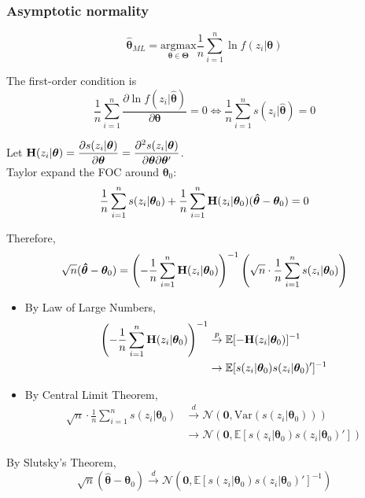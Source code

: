 \documentclass[%
 aip,
 jmp,%
 amsmath,amssymb,
 reprint,%
]{revtex4-1}
\def\N{{\mathbb N}}
\def\th{\theta}
\def\E{\mathbb{E}}
\def\N{\mathcal{N}} %
\def\Var{\mathrm{Var}}
\def\H{\textbf{\textrm{H}}} %
\def\pto{\overset{p}{\to}}
\def\dto{\overset{d}{\to}}
\def\h{\hat}
\def\l{\left}
\def\r{\right}
\newcommand{\mean}[1]{\frac{1}{n}\sum_{i=1}^{n} #1}
\renewcommand{\vec}[1]{\bm{#1}}
\begin{document}
\subsubsection{Asymptotic normality}
$$ \vec{\h\th}_{ML} = \underset{\vec\th \in \vec\Theta}{\mathrm{argmax}} \mean \ln f(z_i|\vec\th) $$

The first-order condition is
$$ \mean \frac{\partial\ln f(z_i|\vec{\h\th})}{\partial\vec\th} = 0 \Leftrightarrow \mean s(z_i|\vec{\h\th}) = 0 $$

Let $\displaystyle \H(z_i|\vec\th) = \frac{\partial s(z_i|\vec{\th})}{\partial\vec\th} = \frac{\partial^2 s(z_i|\vec{\th})}{\partial\vec\th\partial\vec\th'}$.\\

Taylor expand the FOC around $\vec\th_0$:
$$ \mean s(z_i|\vec\th_0) + \mean \H(z_i|\vec\th_0)(\vec{\h\th} - \vec\th_0) = 0 $$

Therefore,
$$ \sqrt{n}(\vec{\h\th} - \vec\th_0) = \l(- \mean \H(z_i|\vec\th_0)\r)^{-1} \l(\sqrt{n}\cdot\mean s(z_i|\vec\th_0) \r) $$

\begin{itemize}
  \item By Law of Large Numbers,
        \begin{align*}
            \l(- \mean \H(z_i|\vec\th_0)\r)^{-1}
                    &\pto \E[-\H(z_i|\vec\th_0)]^{-1} \\
                     &\to \E[s(z_i|\vec\th_0)s(z_i|\vec\th_0)']^{-1}
        \end{align*}
  \item By Central Limit Theorem,
       \begin{align*}
            \sqrt{n}\cdot\mean s(z_i|\vec\th_0)
                   &\dto \N(\vec 0, \Var(s(z_i|\vec\th_0))) \\
                   &\to \N(\vec 0, \E[s(z_i|\vec\th_0)s(z_i|\vec\th_0)'])
        \end{align*}
\end{itemize}

By Slutsky's Theorem,
$$ \sqrt{n}(\vec{\h\th} - \vec\th_0) \dto \N(\vec 0, \E[s(z_i|\vec\th_0)s(z_i|\vec\th_0)']^{-1}) $$
\end{document}
